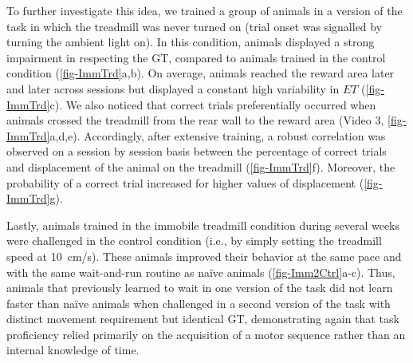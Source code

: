 To further investigate this idea, we trained a group of animals in a version of the task in which the treadmill was never turned on (trial onset was signalled by turning the ambient light on).
In this condition, animals displayed a strong impairment in respecting the GT, compared to animals trained in the control condition (\autoref{fig-ImmTrd}a,b).
On average, animals reached the reward area later and later across sessions but displayed a constant high variability in $ET$ (\autoref{fig-ImmTrd}c).
We also noticed that correct trials preferentially occurred when animals crossed the treadmill from the rear wall to the reward area (Video 3, \autoref{fig-ImmTrd}a,d,e).
Accordingly, after extensive training, a robust correlation was observed on a session by session basis between the percentage of correct trials and displacement of the animal on the treadmill (\autoref{fig-ImmTrd}f).
Moreover, the probability of a correct trial increased for higher values of displacement (\autoref{fig-ImmTrd}g).
\par

Lastly, animals trained in the immobile treadmill condition during several weeks were challenged in the control condition (i.e., by simply setting the treadmill speed at 10~cm/s).
These animals improved their behavior at the same pace and with the same wait-and-run routine as na\"ive animals (\autoref{fig-Imm2Ctrl}a-c).
Thus, animals that previously learned to wait in one version of the task did not learn faster than na\"ive animals when challenged in a second version of the task with distinct movement requirement but identical GT, demonstrating again that task proficiency relied primarily on the acquisition of a motor sequence rather than an internal knowledge of time.